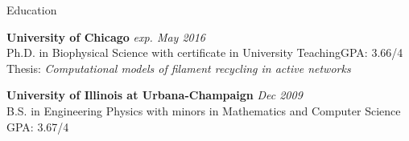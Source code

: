 \documentclass{resume} %
\begin{document}

\begin{rSection}{Education}

{\bf University of Chicago} \hfill {\em exp. May 2016} \\ 
Ph.D. in Biophysical Science with certificate in University Teaching\hfill {GPA: 3.66/4} \\
Thesis: {\em Computational models of filament recycling in active networks}

{\bf University of Illinois at Urbana-Champaign} \hfill {\em Dec 2009} \\ 
B.S. in Engineering Physics with minors in Mathematics and Computer Science \hfill {GPA: 3.67/4} 

\end{rSection}

\end{document}
